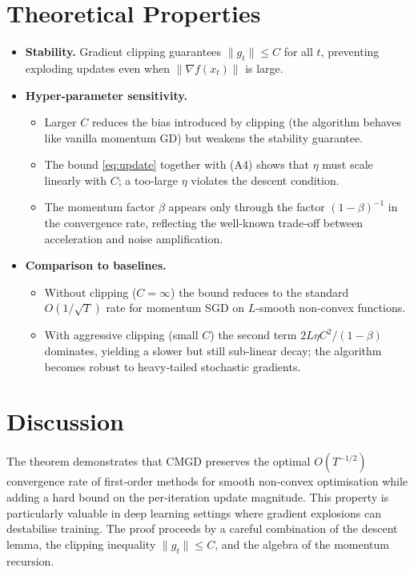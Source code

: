 \documentclass{article}
\begin{document}
\section*{Theoretical Properties}
\begin{itemize}
\item \textbf{Stability.} Gradient clipping guarantees $\|g_t\|\le C$ for all $t$, preventing exploding updates even when $\|\nabla f(x_t)\|$ is large.
\item \textbf{Hyper‑parameter sensitivity.}
    \begin{itemize}
        \item Larger $C$ reduces the bias introduced by clipping (the algorithm behaves like vanilla momentum GD) but weakens the stability guarantee.
        \item The bound \eqref{eq:update} together with (A4) shows that $\eta$ must scale linearly with $C$; a too‑large $\eta$ violates the descent condition.
        \item The momentum factor $\beta$ appears only through the factor $(1-\beta)^{-1}$ in the convergence rate, reflecting the well‑known trade‑off between acceleration and noise amplification.
    \end{itemize}
\item \textbf{Comparison to baselines.}
    \begin{itemize}
        \item Without clipping ($C=\infty$) the bound reduces to the standard $O(1/\sqrt{T})$ rate for momentum SGD on $L$‑smooth non‑convex functions.
        \item With aggressive clipping (small $C$) the second term $2L\eta C^2/(1-\beta)$ dominates, yielding a slower but still sub‑linear decay; the algorithm becomes robust to heavy‑tailed stochastic gradients.
    \end{itemize}
\end{itemize}

\section*{Discussion}
The theorem demonstrates that CMGD preserves the optimal $O(T^{-1/2})$ convergence rate of first‑order methods for smooth non‑convex optimisation while adding a hard bound on the per‑iteration update magnitude. This property is particularly valuable in deep learning settings where gradient explosions can destabilise training. The proof proceeds by a careful combination of the descent lemma, the clipping inequality $\|g_t\|\le C$, and the algebra of the momentum recursion.
\end{document}
